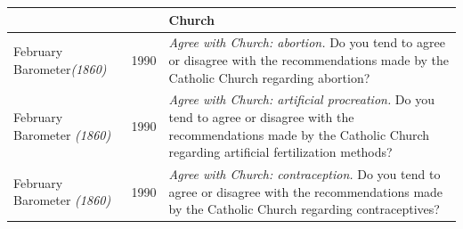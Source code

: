 \documentclass[a4paper,oneside,final,onecolumn,12pt,english]{article}
\begin{document}
\begin{longtable}{p{} p{} p{} }
&&\textbf{Church}\\ \hline
February Barometer\textit{(1860)} &1990& \textit{Agree with Church: abortion.} Do you tend to agree or disagree with the recommendations made by the Catholic Church regarding abortion?\\ \hline
February Barometer \textit{(1860)} &1990& \textit{Agree with Church: artificial procreation.} Do you tend to agree or disagree with the recommendations made by the Catholic Church regarding artificial fertilization methods?\\ \hline
February Barometer \textit{(1860)} &1990& \textit{Agree with Church: contraception.} Do you tend to agree or disagree with the recommendations made by the Catholic Church regarding  contraceptives?\\ \hline




                           
                            

\end{longtable}
\end{document}
